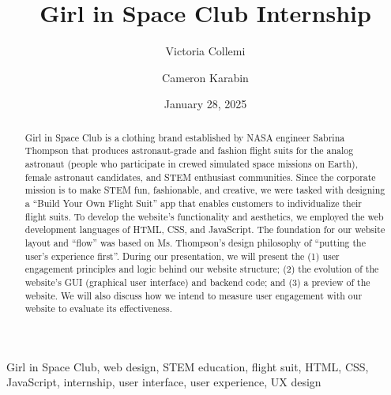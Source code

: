 \documentclass[12pt,conference,onecolumn]{IEEEtran}
\title{Girl in Space Club Internship}
\author{Victoria Collemi \and Cameron Karabin}
\date{January 28, 2025}
\newcommand{\keywords}{Girl in Space Club, web design, STEM education, flight suit, HTML, CSS, JavaScript, internship, user interface, user experience, UX design}
\begin{document}
\maketitle 

\begin{abstract}
Girl in Space Club is a clothing brand established by NASA engineer Sabrina Thompson that produces astronaut-grade and fashion flight suits for the analog astronaut (people who participate in crewed simulated space missions on Earth), female astronaut candidates, and STEM enthusiast communities. Since the corporate mission is to make STEM fun, fashionable, and creative, we were tasked with designing a ``Build Your Own Flight Suit'' app that enables customers to individualize their flight suits. To develop the website's functionality and aesthetics, we employed the web development languages of HTML, CSS, and JavaScript. The foundation for our website layout and ``flow'' was based on Ms. Thompson’s design philosophy of ``putting the user’s experience first''. During our presentation, we will present the (1) user engagement principles and logic behind our website structure; (2) the evolution of the website's GUI (graphical user interface) and backend code; and (3) a preview of the website. We will also discuss how we intend to measure user engagement with our website to evaluate its effectiveness.
\end{abstract}

\begin{IEEEkeywords}
\keywords
\end{IEEEkeywords}
\end{document}
